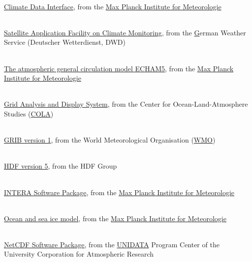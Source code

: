 \begin{thebibliography}{xx}

\label{CDI}
 \ \\
  \href{http://www.mpimet.mpg.de/cdi}
       {Climate Data Interface},
  from the
  \href{http://www.mpimet.mpg.de}
       {Max Planck Institute for Meteorologie}

\label{CM-SAF}
 \ \\
  \href{www.cmsaf.dwd.de}
       {Satellite Application Facility on Climate Monitoring},
  from the
  \href{http://www.dwd.de}
       German Weather Service (Deutscher Wetterdienst, DWD)

\label{ECHAM}
 \ \\
  \href{http://www.mpimet.mpg.de/wissenschaft/publikationen/reports.html}
       {The atmospheric general circulation model ECHAM5},
  from the
  \href{http://www.mpimet.mpg.de}
       {Max Planck Institute for Meteorologie}

\label{GrADS}
 \ \\
  \href{http://www.iges.org/grads/}
       {Grid Analysis and Display System},
  from the Center for Ocean-Land-Atmosphere Studies
  (\href{http://www.iges.org/cola.html}{COLA})

\label{GRIB}
 \ \\
  \href{http://www.wmo.ch/web/www/WMOCodes/Guides/GRIB/GRIB1-Contents.html}
       {GRIB version 1},
  from the World Meteorological Organisation
  (\href{http://www.wmo.ch}{WMO})

\label{HDF5}
 \ \\
  \href{http://hdf.ncsa.uiuc.edu/HDF5/}
       {HDF version 5},
  from the HDF Group

\label{INTERA}
 \ \\
  \href{http://wekuw.met.fu-berlin.de/~IngoKirchner/nudging/nudging}{INTERA Software Package},
  from the
  \href{http://www.mpimet.mpg.de}
       {Max Planck Institute for Meteorologie}

\label{MPIOM}
 \ \\
  \href{http://www.mpimet.mpg.de/en/wissenschaft/modelle/mpiom/mpiom-description.html}
       {Ocean and sea ice model},
  from the
  \href{http://www.mpimet.mpg.de}
       {Max Planck Institute for Meteorologie}

\label{netCDF}
 \ \\
  \href{http://www.unidata.ucar.edu/packages/netcdf}{NetCDF Software Package},
  from the
  \href{http://www.unidata.ucar.edu}{UNIDATA}
  Program Center of the University Corporation for Atmospheric Research


\end{thebibliography}
